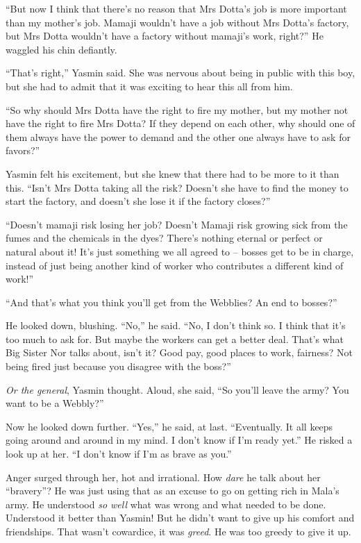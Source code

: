 ``But now I think that there's no reason that Mrs Dotta's job is
more important than my mother's job. Mamaji wouldn't have a job
without Mrs Dotta's factory, but Mrs Dotta wouldn't have a factory
without mamaji's work, right?'' He waggled his chin defiantly.

``That's right,'' Yasmin said. She was nervous about being in public
with this boy, but she had to admit that it was exciting to hear
this all from him.

``So why should Mrs Dotta have the right to fire my mother, but my
mother not have the right to fire Mrs Dotta? If they depend on each
other, why should one of them always have the power to demand and
the other one always have to ask for favors?''

Yasmin felt his excitement, but she knew that there had to be more
to it than this. ``Isn't Mrs Dotta taking all the risk? Doesn't she
have to find the money to start the factory, and doesn't she lose
it if the factory closes?''

``Doesn't mamaji risk losing her job? Doesn't Mamaji risk growing
sick from the fumes and the chemicals in the dyes? There's nothing
eternal or perfect or natural about it! It's just something we all
agreed to -- bosses get to be in charge, instead of just being
another kind of worker who contributes a different kind of work!''

``And that's what you think you'll get from the Webblies? An end to
bosses?''

He looked down, blushing. ``No,'' he said. ``No, I don't think so. I
think that it's too much to ask for. But maybe the workers can get
a better deal. That's what Big Sister Nor talks about, isn't it?
Good pay, good places to work, fairness? Not being fired just
because you disagree with the boss?''

\emph{Or the general}, Yasmin thought. Aloud, she said, ``So you'll
leave the army? You want to be a Webbly?''

Now he looked down further. ``Yes,'' he said, at last. ``Eventually.
It all keeps going around and around in my mind. I don't know if
I'm ready yet.'' He risked a look up at her. ``I don't know if I'm as
brave as you.''

Anger surged through her, hot and irrational. How \emph{dare} he
talk about her ``bravery''? He was just using that as an excuse to go
on getting rich in Mala's army. He understood \emph{so well} what
was wrong and what needed to be done. Understood it better than
Yasmin! But he didn't want to give up his comfort and friendships.
That wasn't cowardice, it was \emph{greed}. He was too greedy to
give it up.

